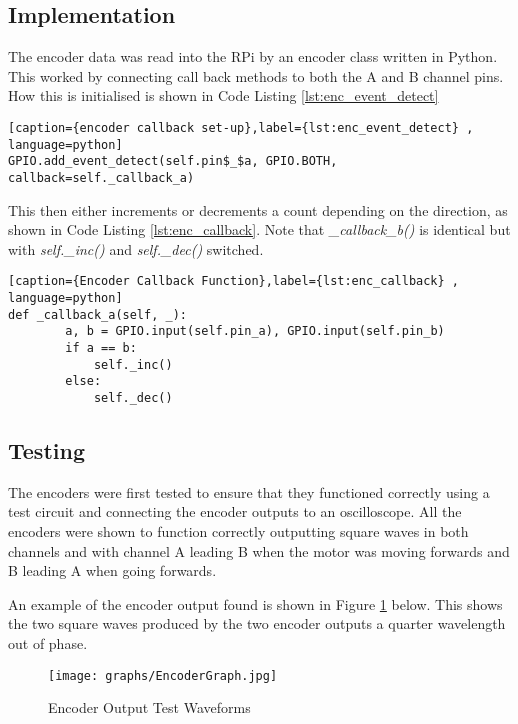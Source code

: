 \subsection{Implementation}\label{elec/encoder/impl}

The encoder data was read into the RPi by an encoder class written in 
Python. This worked by connecting call back methods to both the A and B 
channel pins. How this is initialised is shown in Code Listing 
\ref{lst:enc_event_detect}


\begin{lstlisting}[caption={encoder callback set-up},label={lst:enc_event_detect} , language=python]
GPIO.add_event_detect(self.pin$_$a, GPIO.BOTH, callback=self._callback_a)
\end{lstlisting}

This then either increments or decrements a count depending on the 
direction, as shown in Code Listing \ref{lst:enc_callback}. Note that 
\textit{\_callback\_b()} is identical but with \textit{self.\_inc()} and 
\textit{self.\_dec()} switched.

\begin{lstlisting}[caption={Encoder Callback Function},label={lst:enc_callback} , language=python]
def _callback_a(self, _):
        a, b = GPIO.input(self.pin_a), GPIO.input(self.pin_b)
        if a == b:
            self._inc()
        else:
            self._dec()
\end{lstlisting}


\subsection{Testing}\label{elec/encoder/test}
The encoders were first tested to ensure that they functioned correctly 
using a test circuit and connecting the encoder outputs to an 
oscilloscope. All the encoders were shown to function correctly
outputting square waves in both channels and with channel A leading B
when the motor was moving forwards and B leading A when going forwards.

An example of the encoder output found is shown in Figure
\ref{EncoderGraph} below. This shows the two square waves produced by the
two encoder outputs a quarter wavelength out of phase.

\begin{figure}[!ht]
	\centering
	\texttt{[image: graphs/EncoderGraph.jpg]}
	\caption{Encoder Output Test Waveforms}\label{EncoderGraph}

\end{figure}

